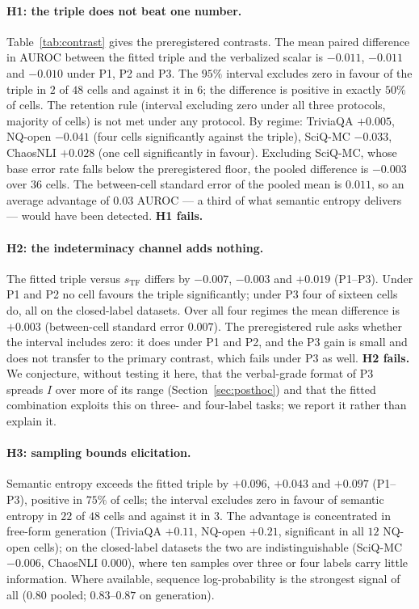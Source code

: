 \documentclass[11pt]{article}
\begin{document}
\paragraph{H1: the triple does not beat one number.} Table~\ref{tab:contrast} gives the
preregistered contrasts. The mean paired difference in AUROC between the fitted triple and the
verbalized scalar is $-0.011$, $-0.011$ and $-0.010$ under P1, P2 and P3. The $95\%$ interval
excludes zero in favour of the triple in $2$ of $48$ cells and against it in $6$; the difference
is positive in exactly $50\%$ of cells. The retention rule (interval excluding zero under all
three protocols, majority of cells) is not met under any protocol. By regime: TriviaQA
$+0.005$, NQ-open $-0.041$ (four cells significantly against the triple), SciQ-MC $-0.033$,
ChaosNLI $+0.028$ (one cell significantly in favour). Excluding SciQ-MC, whose base error rate
falls below the preregistered floor, the pooled difference is $-0.003$ over $36$ cells. The
between-cell standard error of the pooled mean is $0.011$, so an average advantage of $0.03$
AUROC --- a third of what semantic entropy delivers --- would have been detected. \textbf{H1 fails.}

\paragraph{H2: the indeterminacy channel adds nothing.} The fitted triple versus
$s_{\mathrm{TF}}$ differs by $-0.007$, $-0.003$ and $+0.019$ (P1--P3). Under P1 and P2 no cell
favours the triple significantly; under P3 four of sixteen cells do, all on the closed-label
datasets. Over all four regimes the mean difference is $+0.003$ (between-cell standard error
$0.007$). The preregistered rule asks whether the interval includes zero: it does under P1 and P2,
and the P3 gain is small and does not transfer to the primary contrast, which fails under P3 as
well. \textbf{H2 fails.} We conjecture, without testing it here, that the verbal-grade format
of P3 spreads $I$ over more of its range (Section~\ref{sec:posthoc}) and that the fitted
combination exploits this on three- and four-label tasks; we report it rather than explain it.

\paragraph{H3: sampling bounds elicitation.} Semantic entropy exceeds the fitted triple by
$+0.096$, $+0.043$ and $+0.097$ (P1--P3), positive in $75\%$ of cells; the interval excludes
zero in favour of semantic entropy in $22$ of $48$ cells and against it in $3$. The advantage is concentrated in free-form generation (TriviaQA $+0.11$, NQ-open
$+0.21$, significant in all $12$ NQ-open cells); on the closed-label datasets the two are
indistinguishable (SciQ-MC $-0.006$, ChaosNLI $0.000$), where ten samples over three or four
labels carry little information. Where available, sequence log-probability is the strongest
signal of all ($0.80$ pooled; $0.83$--$0.87$ on generation).
\end{document}
